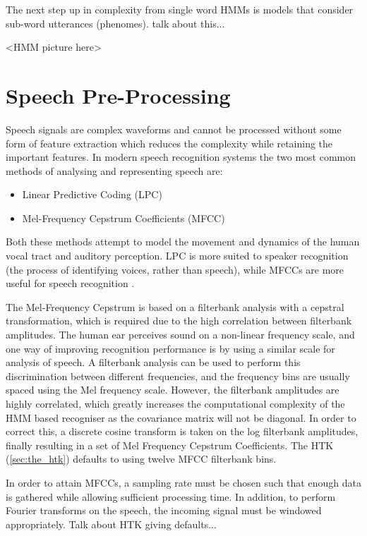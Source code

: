 The next step up in complexity from single word HMMs is models that consider sub-word utterances (phenomes).  talk about this...

<HMM picture here>






\section{Speech Pre-Processing} %
\label{sec:speech_pre_processing}
Speech signals are complex waveforms and cannot be processed without some form of feature extraction which reduces the complexity while retaining the important features.  In modern speech recognition systems the two most common methods of analysing and representing speech are: \cite{gaikwad2010review}
\begin{itemize}
	\item Linear Predictive Coding (LPC)
	\item Mel-Frequency Cepstrum Coefficients (MFCC)
\end{itemize}
Both these methods attempt to model the movement and dynamics of the human vocal tract and auditory perception.  LPC is more suited to speaker recognition (the process of identifying voices, rather than speech), while MFCCs are more useful for speech recognition \cite{sd2012interview}.

The Mel-Frequency Cepstrum is based on a filterbank analysis with a cepstral transformation, which is required due to the high correlation between filterbank amplitudes.  The human ear perceives sound on a non-linear frequency scale, and one way of improving recognition performance is by using a similar scale for analysis of speech.  A filterbank analysis can be used to perform this discrimination between different frequencies, and the frequency bins are usually spaced using the Mel frequency scale.  However, the filterbank amplitudes are highly correlated, which greatly increases the computational complexity of the HMM based recogniser as the covariance matrix will not be diagonal.  In order to correct this, a discrete cosine transform is taken on the log filterbank amplitudes, finally resulting in a set of Mel Frequency Cepstrum Coefficients.  The HTK (\ref{sec:the_htk}) defaults to using twelve MFCC filterbank bins. \cite{htkbook} \cite{melnikoff2003speech}

In order to attain MFCCs, a sampling rate must be chosen such that enough data is gathered while allowing sufficient processing time.  In addition, to perform Fourier transforms on the speech, the incoming signal must be windowed appropriately.  Talk about HTK giving defaults...

